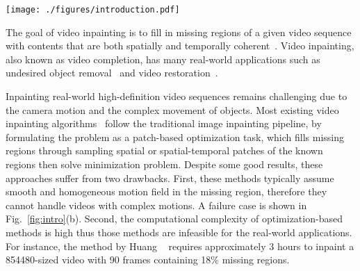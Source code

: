 \documentclass[10pt,twocolumn,letterpaper]{article}
\begin{document}
\begin{figure*}[t]
	\centering
	\texttt{[image: ./figures/introduction.pdf]}
	\vspace{-10pt}
	\caption{In this example, we show two common inpainting settings, foreground object removal and fixed region inpainting. (a) Missing regions are shown in orange. (b) The result of patch-based optimization approach is affected by complex motions. (c) The image inpainting approach is incapable of maintaining the temporal coherence. (d) Our approach considers the video inpainting as a pixel propagation problem, in which the optical flow field is completed (shown on the left) and then the synthesized flow field is used to guide the propagation of pixels to fill up missing regions (shown on the right). Our inpainting preserves the detail and video coherence.}
	\label{fig:intro}
	\vspace{-14pt}
\end{figure*}


The goal of video inpainting is to fill in missing regions of a given video sequence with contents that are both spatially and temporally coherent~\cite{bertalmio2001navier, Huang-SigAsia-2016, newson2014video, patwardhan2007video}. Video inpainting, also known as video completion, has many real-world applications such as undesired object removal~\cite{ebdelli2015video} and video restoration~\cite{tang2011video}. 


Inpainting real-world high-definition video sequences remains challenging due to the camera motion and the complex movement of objects. 
Most existing video inpainting algorithms~\cite{Huang-SigAsia-2016, newson2013towards, newson2014video, shih2009exemplar, strobel2014flow} follow the traditional image inpainting pipeline, by formulating the problem as a patch-based optimization task, which fills missing regions through sampling spatial or spatial-temporal patches of the known regions then solve minimization problem.
Despite some good results, these approaches suffer from two drawbacks.
First, these methods typically assume smooth and homogeneous motion field in the missing region, therefore they cannot handle videos with complex motions.
A failure case is shown in Fig.~\ref{fig:intro}(b).
Second, the computational complexity of optimization-based methods is high thus those methods are infeasible for the real-world applications.
For instance, the method by Huang \etal~\cite{Huang-SigAsia-2016} requires approximately 3 hours to inpaint a 854480-sized video with 90 frames containing 18\% missing regions.
\end{document}
